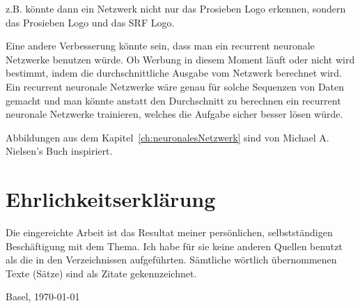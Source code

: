 \documentclass[12pt,a4paper]{report}
\begin{document}
z.B. könnte dann ein Netzwerk nicht nur das Prosieben Logo erkennen, sondern das Prosieben Logo und das SRF Logo.

Eine andere Verbesserung könnte sein, dass man ein recurrent neuronale Netzwerke\cite{wiki:rnn} benutzen würde.
Ob Werbung in diesem Moment läuft oder nicht wird bestimmt, indem die durchschnittliche Ausgabe vom Netzwerk berechnet wird.
Ein recurrent neuronale Netzwerke wäre genau für solche Sequenzen von Daten gemacht und man könnte anstatt den Durchschnitt zu berechnen
ein recurrent neuronale Netzwerke trainieren, welches die Aufgabe sicher besser lösen würde.


\clearpage
{}
{}
\nocite{*}



\clearpage
{}
{}
\listoffigures
Abbildungen aus dem Kapitel~\ref{ch:neuronalesNetzwerk} sind von Michael A. Nielsen's Buch\cite{neuralbook} inspiriert.

\appendix


\chapter*{Ehrlichkeitserklärung}

Die eingereichte Arbeit ist das Resultat meiner persönlichen, selbstständigen Beschäftigung mit dem Thema.
Ich habe für sie keine anderen Quellen benutzt als die in den Verzeichnissen aufgeführten.
Sämtliche wörtlich übernommenen Texte (Sätze) sind als Zitate gekennzeichnet.

\vspace{2cm}
Basel, \today
\end{document}
